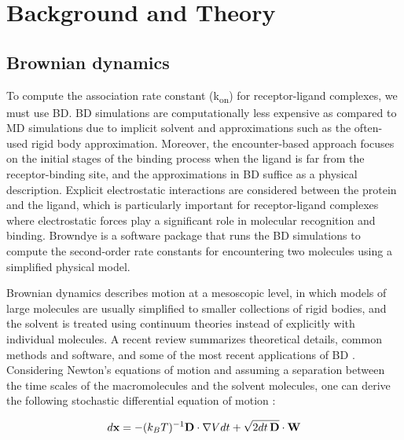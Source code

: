 \documentclass[9pt,training,pubversion]{livecoms}
\begin{document}
\section{Background and Theory}
\vspace{2mm}

\subsection{Brownian dynamics}
\vspace{2mm}

\noindent To compute the association rate constant (k\textsubscript{on}) for receptor-ligand complexes, we must use BD. BD simulations are computationally less expensive as compared to MD simulations due to implicit solvent and approximations such as the often-used rigid body approximation. Moreover, the encounter-based approach focuses on the initial stages of the binding process when the ligand is far from the receptor-binding site, and the approximations in BD suffice as a physical description. Explicit electrostatic interactions are considered between the protein and the ligand, which is particularly important for receptor-ligand complexes where electrostatic forces play a significant role in molecular recognition and binding. Browndye \cite{huber2010browndye} is a software package that runs the BD simulations to compute the second-order rate constants for encountering two molecules using a simplified physical model.  \par

\noindent Brownian dynamics describes motion at a mesoscopic level, in which models of large molecules are usually simplified to smaller collections of rigid bodies, and the solvent is treated using continuum theories \cite{huber2019brownian} instead of explicitly with individual molecules. A recent review summarizes theoretical details, common methods and software, and some of the most recent applications of BD \cite{muniz2023brownian}.  Considering Newton's equations of motion and assuming a separation between the time scales of the macromolecules and the solvent molecules, one can derive the following stochastic differential equation of motion \cite{ermak1978brownian}:

\begin{equation}
d{\bf x} = -(k_B T)^{-1}{\bf D}\cdot\nabla V dt + \sqrt{2 dt\, {\bf D}}\cdot {\bf W}
\label{eq:bd}
\end{equation}
\end{document}
